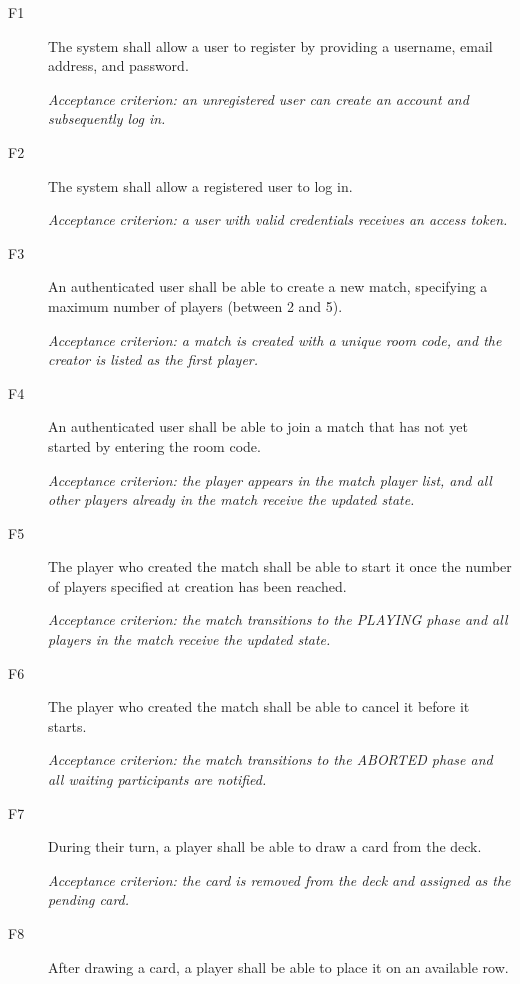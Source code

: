 \documentclass{scrartcl}
\begin{document}
\begin{description}
  \item[F1] The system shall allow a user to register by providing a username, email address, and password.

  \textit{Acceptance criterion: an unregistered user can create an account and subsequently log in.}

  \item[F2] The system shall allow a registered user to log in.

  \textit{Acceptance criterion: a user with valid credentials receives an access token.}

  \item[F3] An authenticated user shall be able to create a new match, specifying a maximum number of players (between 2 and 5).

  \textit{Acceptance criterion: a match is created with a unique room code, and the creator is listed as the first player.}

  \item[F4] An authenticated user shall be able to join a match that has not yet started by entering the room code.

  \textit{Acceptance criterion: the player appears in the match player list, and all other players already in the match receive the updated state.}

  \item[F5] The player who created the match shall be able to start it once the number of players specified at creation has been reached.

  \textit{Acceptance criterion: the match transitions to the PLAYING phase and all players in the match receive the updated state.}

  \item[F6] The player who created the match shall be able to cancel it before it starts.

  \textit{Acceptance criterion: the match transitions to the ABORTED phase and all waiting participants are notified.}

  \item[F7] During their turn, a player shall be able to draw a card from the deck.

  \textit{Acceptance criterion: the card is removed from the deck and assigned as the pending card.}

  \item[F8] After drawing a card, a player shall be able to place it on an available row.


\end{description}
\end{document}
